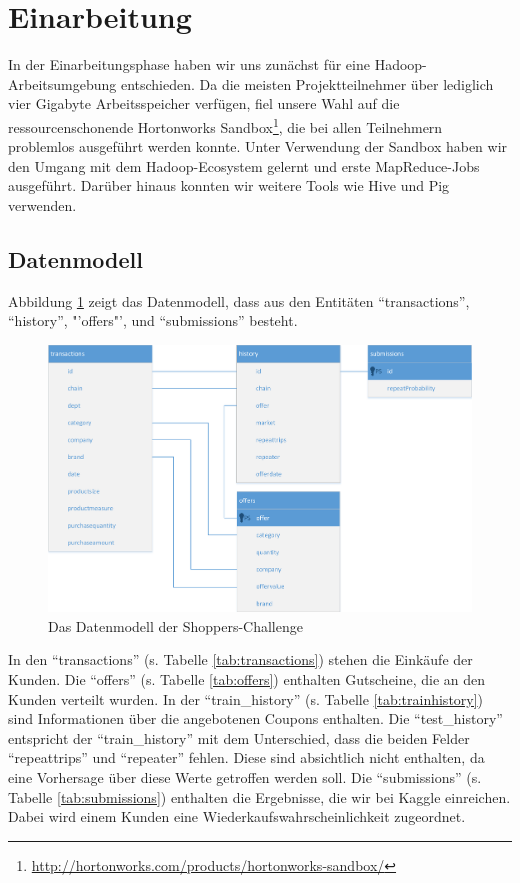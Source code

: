 \section{Einarbeitung}
In der Einarbeitungsphase haben wir uns zunächst für eine Hadoop-Arbeitsumgebung entschieden. Da die meisten Projektteilnehmer über lediglich vier Gigabyte Arbeitsspeicher verfügen, fiel unsere Wahl auf die ressourcenschonende Hortonworks Sandbox\footnote{\url{http://hortonworks.com/products/hortonworks-sandbox/}}, die bei allen Teilnehmern problemlos ausgeführt werden konnte. Unter Verwendung der Sandbox haben wir den Umgang mit dem Hadoop-Ecosystem gelernt und erste MapReduce-Jobs ausgeführt. Darüber hinaus konnten wir weitere Tools wie Hive und Pig verwenden.

\renewcommand{\arraystretch}{1.3}

\subsection{Datenmodell}
Abbildung \ref{fig:ShoppersTables} zeigt das Datenmodell, dass aus den Entitäten "`transactions"', "`history"', "'offers"', und "`submissions"' besteht. 

\begin{figure}[H]
\centering
\includegraphics[width=0.93\linewidth]{Bilder/ShoppersTables}
\caption{Das Datenmodell der Shoppers-Challenge}
\label{fig:ShoppersTables}
\end{figure}

In den "`transactions"' (s. Tabelle \ref{tab:transactions}) stehen die Einkäufe der Kunden.
Die "`offers"' (s. Tabelle \ref{tab:offers}) enthalten Gutscheine, die an den Kunden verteilt wurden.
In der "`train\_history"' (s. Tabelle \ref{tab:trainhistory}) sind Informationen über die angebotenen Coupons enthalten.
Die "`test\_history"' entspricht der "`train\_history"' mit dem Unterschied, dass die beiden Felder "`repeattrips"' und "`repeater"' fehlen. Diese sind absichtlich nicht enthalten, da eine Vorhersage über diese Werte getroffen werden soll.
Die "`submissions"' (s. Tabelle \ref{tab:submissions}) enthalten die Ergebnisse, die wir bei Kaggle einreichen. Dabei wird einem Kunden eine Wiederkaufswahrscheinlichkeit zugeordnet.

